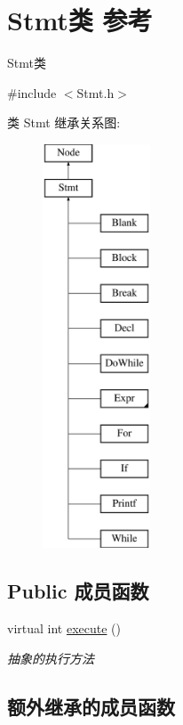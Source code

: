 \hypertarget{class_stmt}{}\section{Stmt类 参考}
\label{class_stmt}


Stmt类  




{\ttfamily \#include $<$Stmt.\+h$>$}

类 Stmt 继承关系图\+:\begin{figure}[H]
\begin{center}
\leavevmode
\includegraphics[height=12.000000cm]{class_stmt}
\end{center}
\end{figure}
\subsection*{Public 成员函数}
\begin{DoxyCompactItemize}
\item 
virtual int \hyperlink{class_stmt_abdc3261770c3c5bd3ce5b3ba6eedfaa4}{execute} ()
\begin{DoxyCompactList}\small\item\em 抽象的执行方法 \end{DoxyCompactList}\end{DoxyCompactItemize}
\subsection*{额外继承的成员函数}


